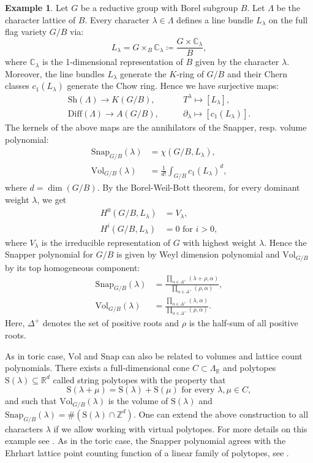 \documentclass[oneside]{amsart}
\theoremstyle{plain}
\theoremstyle{definition}
\newtheorem{example}[theorem]{Example}
\newcommand{\C}{{\mathbb{C}}}
\newcommand{\R}{{\mathbb{R}}}
\newcommand{\Z}{{\mathbb{Z}}}
\newcommand{\Diff}{{\mathrm{Diff}}}
\newcommand{\Vol}{{\mathrm{Vol}}}
\newcommand{\Sh}{{\mathrm{Sh}}}
\begin{document}
\begin{example}
\label{ex:full-flags}
Let $G$ be a reductive group with Borel subgroup $B$. Let $\Lambda$ be the character lattice of $B$. 
Every character $\lambda\in \Lambda$ defines a line bundle $L_\lambda$ on the full flag variety $G/B$ via:
\[
L_\lambda = G\times_B \C_\lambda \coloneqq \frac{G\times \C_\lambda}{B},
\]
where $\C_\lambda$ is the 1-dimensional representation of $B$ given by the character $\lambda$.
Moreover, the line bundles $L_\lambda$ generate the $K$-ring of $G/B$ and their Chern classes $c_1(L_\lambda)$ generate the Chow ring. Hence we have surjective maps:
\begin{align*}
        \Sh(\Lambda) \to K(G/B),& \qquad T^{\lambda} \mapsto [L_\lambda],\\
        \Diff(\Lambda) \to A(G/B),& \qquad \partial_{\lambda} \mapsto [c_1(L_\lambda)].
    \end{align*}
The kernels of the above maps are the annihilators of the Snapper, resp. volume polynomial:
\begin{align*}
   \mathrm{Snap}_{G/B}(\lambda) &= \chi(G/B, L_\lambda),\\
    \Vol_{G/B}(\lambda) &= \frac{1}{d!} \int_{G/B} c_1(L_\lambda)^{d},
\end{align*}
where $d = \dim(G/B)$.
By the Borel-Weil-Bott theorem, for every dominant weight $\lambda$, we get
\begin{align*}
H^0(G/B,L_\lambda) &= V_\lambda,\\
H^i(G/B,L_\lambda) &= 0 \text{ for } i>0,
\end{align*}
where $V_\lambda$ is the irreducible representation of $G$ with highest weight $\lambda$. Hence the 
Snapper polynomial for $G/B$ is given by Weyl dimension polynomial and $\Vol_{G/B}$ by its top homogeneous component:
\begin{align*}
   \mathrm{Snap}_{G/B}(\lambda) &= \frac{\prod_{\alpha\in \Delta^+}(\lambda+\rho,\alpha)}{\prod_{\alpha\in \Delta^+}(\rho,\alpha)},\\
    \Vol_{G/B}(\lambda) &= \frac{\prod_{\alpha\in \Delta^+}(\lambda,\alpha)}{\prod_{\alpha\in \Delta^+}(\rho,\alpha)}.
\end{align*}
Here, $\Delta^+$ denotes the set of positive roots and $\rho$ is the half-sum of all positive roots.

As in toric case, $\Vol$ and $\mathrm{Snap}$ can also be related  to volumes and lattice count polynomials. There exists a full-dimensional cone $C\subset \Lambda_\R$ and polytopes $\mathrm{S}(\lambda)\subseteq \R^d$ called string polytopes \cite{littelmanncones,BerZel} with the property that
\[
\mathrm{S}(\lambda+\mu)=\mathrm{S}(\lambda) + \mathrm{S}(\mu) \text{ for every } \lambda,\mu\in C,
\]
and such that $\Vol_{G/B}(\lambda)$ is the volume of $\mathrm{S}(\lambda)$
and $\mathrm{Snap}_{G/B}(\lambda) = \#(\mathrm{S}(\lambda) \cap \Z^d)$.
One can extend the above construction to all characters $\lambda$ if we allow working with virtual polytopes.
For more details on this example see \cite{MoninSmirnov23,Kaveh11}.
As in the toric case, the Snapper polynomial agrees with the Ehrhart lattice point counting function of a linear family of polytopes, see .
\end{example}
\end{document}

